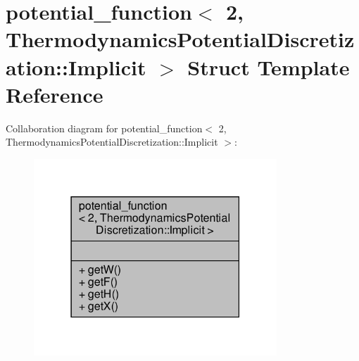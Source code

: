 \hypertarget{structpotential__function_3_012_00_01ThermodynamicsPotentialDiscretization_1_1Implicit_01_4}{}\section{potential\+\_\+function$<$ 2, Thermodynamics\+Potential\+Discretization\+:\+:Implicit $>$ Struct Template Reference}
\label{structpotential__function_3_012_00_01ThermodynamicsPotentialDiscretization_1_1Implicit_01_4}


Collaboration diagram for potential\+\_\+function$<$ 2, Thermodynamics\+Potential\+Discretization\+:\+:Implicit $>$\+:\nopagebreak
\begin{figure}[H]
\begin{center}
\leavevmode
\includegraphics[width=259pt]{structpotential__function_3_012_00_01ThermodynamicsPotentialDiscretization_1_1Implicit_01_4__coll__graph}
\end{center}
\end{figure}
